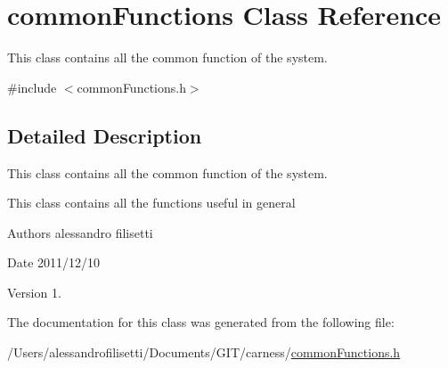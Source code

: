 \hypertarget{a00013}{\section{common\-Functions Class Reference}
\label{a00013}
}


This class contains all the common function of the system.  




{\ttfamily \#include $<$common\-Functions.\-h$>$}



\subsection{Detailed Description}
This class contains all the common function of the system. 

This class contains all the functions useful in general \begin{DoxyAuthor}{Authors}
alessandro filisetti 
\end{DoxyAuthor}
\begin{DoxyDate}{Date}
2011/12/10 
\end{DoxyDate}
\begin{DoxyVersion}{Version}
1. 
\end{DoxyVersion}


The documentation for this class was generated from the following file\-:\begin{DoxyCompactItemize}
\item 
/\-Users/alessandrofilisetti/\-Documents/\-G\-I\-T/carness/\hyperlink{a00076}{common\-Functions.\-h}\end{DoxyCompactItemize}
